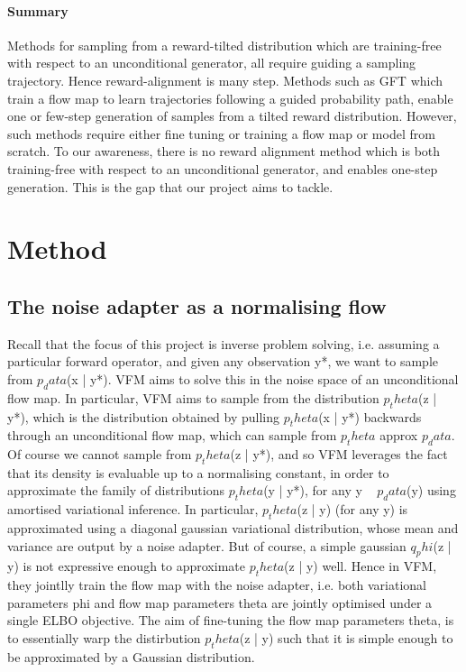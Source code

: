 \documentclass[12pt,a4paper]{report}
\begin{document}
\subsubsection{Summary} 
Methods for sampling from a reward-tilted distribution which are training-free with respect to an unconditional generator, all require guiding a sampling trajectory. 
Hence reward-alignment is many step. 
Methods such as GFT which train a flow map to learn trajectories following a guided probability path, enable one or few-step generation of samples from a tilted reward distribution. 
However, such methods require either fine tuning or training a flow map or model from scratch. 
To our awareness, there is no reward alignment method which is both training-free with respect to an unconditional generator, and enables one-step generation. 
This is the gap that our project aims to tackle. 


\chapter{Method}
\section{The noise adapter as a normalising flow}
Recall that the focus of this project is inverse problem solving, i.e. assuming a particular forward operator, and given any observation y*, we want to sample from $p_data$(x | y*). 
VFM aims to solve this in the noise space of an unconditional flow map. 
In particular, VFM aims to sample from the distribution $p_theta$(z | y*), which is the distribution obtained by pulling $p_theta$(x | y*) backwards through an unconditional flow map, which can sample from $p_theta$ approx $p_data$. 
Of course we cannot sample from $p_theta$(z | y*), and so VFM leverages the fact that its density is evaluable up to a normalising constant, in order to approximate the family of distributions $p_theta$(y | y*), for any y ~ $p_data$(y) using amortised variational inference. 
In particular, $p_theta$(z | y) (for any y) is approximated using a diagonal gaussian variational distribution, whose mean and variance are output by a noise adapter. 
But of course, a simple gaussian $q_phi$(z | y) is not expressive enough to approximate $p_theta$(z | y) well. 
Hence in VFM, they jointlly train the flow map with the noise adapter, i.e. both variational parameters phi and flow map parameters theta are jointly optimised under a single ELBO objective. 
The aim of fine-tuning the flow map parameters theta, is to essentially warp the distirbution $p_theta$(z | y) such that it is simple enough to be approximated by a Gaussian distribution. 
\end{document}
